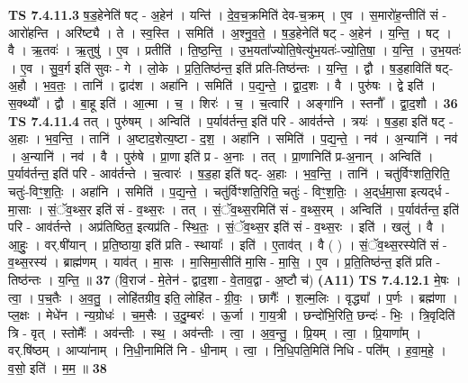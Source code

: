 \documentclass[17pt]{extarticle}
\begin{document}
                  \newline
                                \textbf{ TS 7.4.11.3} \newline
                  ष॒ड॒हेनेति॑ षट् - अ॒हेन॑ । यन्ति॑ । दे॒व॒च॒क्रमिति॑ देव-च॒क्रम् । ए॒व । स॒मारो॑ह॒न्तीति॑ सं - आरो॑हन्ति । अरि॑ष्ट्यै । ते । स्व॒स्ति । समिति॑ । अ॒श्नु॒व॒ते॒ । ष॒ड॒हेनेति॑ षट् - अ॒हेन॑ । य॒न्ति॒ । षट् । वै । ऋ॒तवः॑ । ऋ॒तुषु॑ । ए॒व । प्रतीति॑ । ति॒ष्ठ॒न्ति॒ । उ॒भ॒यता᳚ज्योति॒षेत्यु॑भ॒यतः॑-ज्यो॒ति॒षा॒ । य॒न्ति॒ । उ॒भ॒यतः॑ । ए॒व । सु॒व॒र्ग इति॑ सुवः - गे । लो॒के । प्र॒ति॒तिष्ठ॑न्त॒ इति॑ प्रति-तिष्ठ॑न्तः । य॒न्ति॒ । द्वौ । ष॒ड॒हाविति॑ षट्-अ॒हौ । भ॒व॒तः॒ । तानि॑ । द्वाद॑श । अहा॑नि । समिति॑ । प॒द्य॒न्ते॒ । द्वा॒द॒शः । वै । पुरु॑षः । द्वे इति॑ । स॒क्थ्यौ᳚ । द्वौ । बा॒हू इति॑ । आ॒त्मा । च॒ । शिरः॑ । च॒ । च॒त्वारि॑ । अङ्गा॑नि । स्तनौ᳚ । द्वा॒द॒शौ । \textbf{  36} \newline
                  \newline
                                \textbf{ TS 7.4.11.4} \newline
                  तत् । पुरु॑षम् । अन्विति॑ । प॒र्याव॑र्तन्त॒ इति॑ परि - आव॑र्तन्ते । त्रयः॑ । ष॒ड॒हा इति॑ षट् - अ॒हाः । भ॒व॒न्ति॒ । तानि॑ । अ॒ष्टाद॒शेत्य॒ष्टा - द॒श॒ । अहा॑नि । समिति॑ । प॒द्य॒न्ते॒ । नव॑ । अ॒न्यानि॑ । नव॑ । अ॒न्यानि॑ । नव॑ । वै । पुरु॑षे । प्रा॒णा इति॑ प्र - अ॒नाः । तत् । प्रा॒णानिति॑ प्र-अ॒नान् । अन्विति॑ । प॒र्याव॑र्तन्त॒ इति॑ परि - आव॑र्तन्ते । च॒त्वारः॑ । ष॒ड॒हा इति॑ षट्- अ॒हाः । भ॒व॒न्ति॒ । तानि॑ । चतु॑र्विꣳशति॒रिति॒ चतुः॑-विꣳ॒॒श॒तिः॒ । अहा॑नि । समिति॑ । प॒द्य॒न्ते॒ । चतु॑र्विꣳशति॒रिति॒ चतुः॑ - विꣳ॒॒श॒तिः॒ । अ॒द्‌र्ध॒मा॒सा इत्यद्‌र्ध - मा॒साः । सं॒ॅव॒थ्स॒र इति॑ सं - व॒थ्स॒रः । तत् । सं॒ॅव॒थ्स॒रमिति॑ सं - व॒थ्स॒रम् । अन्विति॑ । प॒र्याव॑र्तन्त॒ इति॑ परि - आव॑र्तन्ते । अप्र॑तिष्ठित॒ इत्यप्र॑ति - स्थि॒तः॒ । सं॒ॅव॒थ्स॒र इति॑ सं - व॒थ्स॒रः । इति॑ । खलु॑ । वै । आ॒हुः॒ । वर्.षी॑यान् । प्र॒ति॒ष्ठाया॒ इति॑ प्रति - स्थायाः᳚ । इति॑ । ए॒ताव॑त् । वै ( ) । सं॒ॅव॒थ्स॒रस्येति॑ सं - व॒थ्स॒रस्य॑ । ब्राह्म॑णम् । याव॑त् । मा॒सः । मा॒सिमा॒सीति॑ मा॒सि - मा॒सि॒ । ए॒व । प्र॒ति॒तिष्ठ॑न्त॒ इति॑ प्रति - तिष्ठ॑न्तः । य॒न्ति॒ ॥ \textbf{  37} \newline
                  \newline
                      (वि॒राज॑ - मे॒तेन॑ - द्वाद॒शा - वे॒ताव॒द्वा - अ॒ष्टौ च॑)  \textbf{(A11)} \newline \newline
                                \textbf{ TS 7.4.12.1} \newline
                  मे॒षः । त्वा॒ । प॒च॒तैः । अ॒व॒तु॒ । लोहि॑तग्रीव॒ इति॒ लोहि॑त - ग्री॒वः॒ । छागैः᳚ । श॒ल्म॒लिः । वृद्ध्या᳚ । प॒र्णः । ब्रह्म॑णा । प्ल॒क्षः । मेधे॑न । न्य॒ग्रोधः॑ । च॒म॒सैः । उ॒दु॒म्बरः॑ । ऊ॒र्जा । गा॒य॒त्री । छन्दो॑भि॒रिति॒ छन्दः॑ - भिः॒ । त्रि॒वृदिति॑ त्रि - वृत् । स्तोमैः᳚ । अव॑न्तीः । स्थ॒ । अव॑न्तीः । त्वा॒ । अ॒व॒न्तु॒ । प्रि॒यम् । त्वा॒ । प्रि॒याणा᳚म् । वर्.षि॑ष्ठम् । आप्या॑नाम् । नि॒धी॒नामिति॑ नि - धी॒नाम् । त्वा॒ । नि॒धि॒पति॒मिति॑ निधि - पति᳚म् । ह॒वा॒म॒हे॒ । व॒सो॒ इति॑ । म॒म॒ ॥ \textbf{  38} \newline
\end{document}
